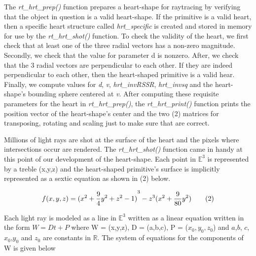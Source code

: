 \hspace{30} The   \textit{rt\_hrt\_prep()}   function   prepares   a   heart-­shape   for   ray­tracing   by  
verifying   that   the   object   in   question   is   a   valid   heart-­shape.   If   the   primitive   is   a  
valid   heart,   then   a   specific   heart   structure   called   \textit{hrt\_specific}   is   created   and  
stored   in   memory   for   use   by   the   \textit{rt\_hrt\_shot()}   function.   To   check   the   validity   of  
the   heart,   we   first   check   that   at least   one   of   the   three   radial   vectors   has   a  
non-zero   magnitude.   Secondly,   we   check   that   the   value   for   parameter   d   is  
non­zero.   After,   we   check   that   the   3   radial   vectors   are  
perpendicular   to   each other.   If   they   are   indeed   perpendicular   to   each   other,   then  
the   heart­-shaped   primitive   is   a   valid   hear.   Finally,   we   compute   values   for   \textit{d},   \textit{v},  
\textit{hrt\_invRSSR},   \textit{hrt\_invsq}   and   the   heart-shape's   bounding   sphere   centered   at   \textit{v}.   After  
computing   these   requisite   parameters   for   the   heart   in   \textit{rt\_hrt\_prep()},   the  
\textit{rt\_hrt\_print()}   function   prints   the   position   vector   of   the   heart-­shape's   center   and  
the   two   (2)   matrices   for   transposing,   rotating   and   scaling   just   to   make   sure   that  
are correct.

\hspace{30} Millions   of   light   rays   are   shot   at   the   surface   of   the   heart   and   the   pixels  
where   intersections   occur   are   rendered.   The   \textit{rt\_hrt\_shot()}   function   came   in  
handy   at   this   point   of   our   development   of   the   heart-­shape.   Each   point   in $ \mathbb{E}^3 $
   is   represented   by   a   treble   (x,y,z)   and   the heart-­shaped   primitive's   surface   is   implicitly   represented   as   a   sextic   equation as shown in (2) below.  

\begin{equation*}
\centering
  ­­­­­­­­­­­­­­f(x,y,z) = {(x^2 + \frac{9}{4}y^2 + z^2 - 1 )}^3 - z^3(x^2 + \frac{9}{80}y^2) \tag{2}
\end{equation*}

Each   light   ray   is   modeled   as   a   line   in   $ \mathbb{E}^3 $   written  
as   a   linear   equation   written   in   the   form   $W   =   Dt   +   P$   where   W   =   (x,y,z),   D   =   (a,b,c),  
P   =   ($x_0,y_0 ,z_0$) and $a$,$ b$, $ c$,$x_0$,$y_0$ and $z_0$ are constants in $ \mathbb{R} $.   The   system   of  
equations for the components of W is given below

